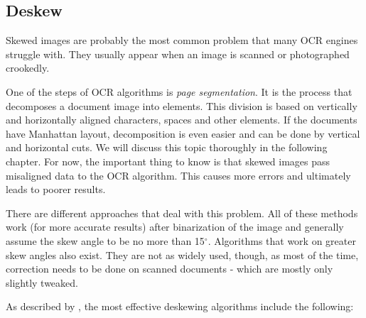 \subsection{Deskew}

Skewed images are probably the most common problem that many OCR engines struggle with. They usually appear when an image is scanned or photographed crookedly. 

One of the steps of OCR algorithms is \emph{page segmentation}. It is the process that decomposes a document image into elements. This division is based on vertically and horizontally aligned characters, spaces and other elements. If the documents have Manhattan layout, decomposition is even easier and can be done by vertical and horizontal cuts. We will discuss this topic thoroughly in the following chapter. For now, the important thing to know is that skewed images pass misaligned data to the OCR algorithm. This causes more errors and ultimately leads to poorer results.

There are different approaches that deal with this problem. All of these methods work (for more accurate results) after binarization of the image and generally assume the skew angle to be no more than 15$^{\circ}$. Algorithms that work on greater skew angles also exist\citep{skewAngleDetection}. They are not as widely used, though, as most of the time, correction needs to be done on scanned documents - which are mostly only slightly tweaked.

As described by \citet{skewBestTechniques}, the most effective deskewing algorithms include the following:

